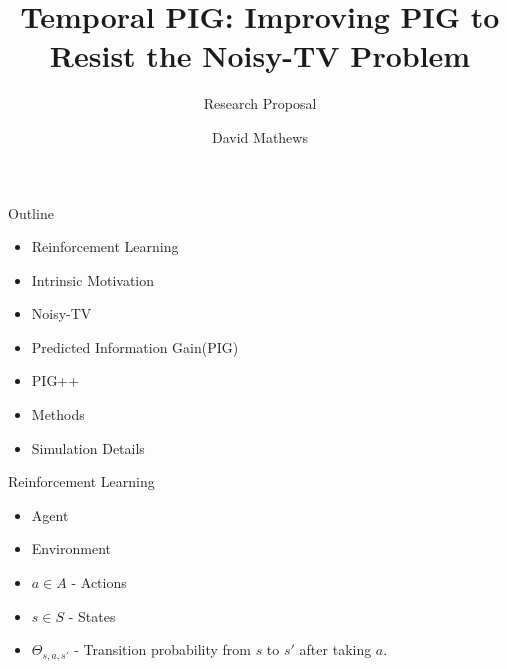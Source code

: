 

\title{Temporal PIG: Improving PIG to Resist the Noisy-TV Problem}
\subtitle{Research Proposal}
\author{David Mathews}




\usepackage{bm}
\usepackage{amsmath}
\usepackage{array}
\usepackage{subfigure}
\setlength{\extrarowheight}{2pt}

\newcommand{\real}{\mathbb{R}}
\newcommand{\norm}[1]{\left\lVert#1\right\rVert}

\usepackage{calligra}
\usepackage{hyperref}


	
	\begin{frame}{}
		\maketitle
	\end{frame}
	
	
	\begin{frame}[fragile]{Outline}
		\begin{itemize}
			\item Reinforcement Learning
			\item Intrinsic Motivation
			\item Noisy-TV
			\item Predicted Information Gain(PIG)
			\item PIG++
			\item Methods
			\item Simulation Details
		\end{itemize}
	\end{frame}
	
	
	\begin{frame}[fragile]{Reinforcement Learning}
		\begin{itemize}
			\item {Agent}
			\item {Environment}
			\item {$a \in A$ - Actions}
			\item {$s \in S$ - States}
			\item { $\Theta_{s,a,s'}$ - Transition probability from $s$ to $s'$ after taking $a$.}
		\end{itemize}
	\end{frame}
	
